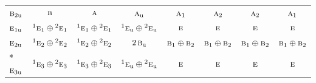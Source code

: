 \documentclass[10pt,a4paper]{article}
\numberwithin{equation}{section}
\newcommand{\irr}[1]{\text{\normalfont\scshape #1}}
\newcommand{\conjpair}[1]{{}^{#1}}
\newcommand{\ptag}[1]{\mathrm{#1}}
\begin{document}
{\begin{longtable}{@{}lccccccc@{}}
$\irr{b}_{2\ptag{u}}$ & $\irr{b}$ & $\irr{a}$ & $\irr{a}_{\ptag{u}}$ & $\irr{a}_{1}$ & $\irr{a}_{2}$ & $\irr{a}_{2}$ & $\irr{a}_{1}$\\
$\irr{e}_{1\ptag{u}}$ & $\conjpair{1}\irr{e}_{1}\oplus \conjpair{2}\irr{e}_{1}$ & $\conjpair{1}\irr{e}_{1}\oplus \conjpair{2}\irr{e}_{1}$ & $\conjpair{1}\irr{e}_{\ptag{u}}\oplus \conjpair{2}\irr{e}_{\ptag{u}}$ & $\irr{e}$ & $\irr{e}$ & $\irr{e}$ & $\irr{e}$\\
$\irr{e}_{2\ptag{u}}$ & $\conjpair{1}\irr{e}_{2}\oplus \conjpair{2}\irr{e}_{2}$ & $\conjpair{1}\irr{e}_{2}\oplus \conjpair{2}\irr{e}_{2}$ & $2\,\irr{b}_{\ptag{u}}$ & $\irr{b}_{1}\oplus \irr{b}_{2}$ & $\irr{b}_{1}\oplus \irr{b}_{2}$ & $\irr{b}_{1}\oplus \irr{b}_{2}$ & $\irr{b}_{1}\oplus \irr{b}_{2}$\\*
$\irr{e}_{3\ptag{u}}$ & $\conjpair{1}\irr{e}_{3}\oplus \conjpair{2}\irr{e}_{3}$ & $\conjpair{1}\irr{e}_{3}\oplus \conjpair{2}\irr{e}_{3}$ & $\conjpair{1}\irr{e}_{\ptag{u}}\oplus \conjpair{2}\irr{e}_{\ptag{u}}$ & $\irr{e}$ & $\irr{e}$ & $\irr{e}$ & $\irr{e}$\\
\bottomrule\end{longtable}}
\end{document}
